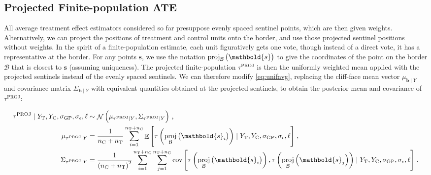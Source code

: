 \documentclass[letter]{article}
\DeclareMathOperator{\E}{\mathbb{E}}
\DeclareMathOperator{\cov}{{cov}}
\DeclareMathOperator{\normal}{\mathcal{N}}
\newcommand{\treat}{\mathrm{T}}
\newcommand{\ctrol}{\mathrm{C}}
\newcommand{\sigmaf}{\sigma_{\mathrm{GP}}}
\newcommand{\sigman}{\sigma_{\epsilon}}
\newcommand{\svec}{\mathbold{s}}
\newcommand{\boundary}{\mathcal{B}}
\newcommand{\sentinels}{\bm{b}}
\newcommand{\tauproj}{\tau^{\mathrm{PROJ}}}
\newcommand{\eqlabel}[1]{\label{#1}}
\DeclareMathOperator{\proj}{proj}
\begin{document}
    	\subsection{Projected Finite-population ATE}\label{projected-finite-population-ate}

All average treatment effect estimators considered so far presuppose evenly spaced sentinel points, which are then given weights.
Alternatively, we can project the positions of treatment and control units onto the border, and use those projected sentinel positions without weights.
In the spirit of a finite-population estimate, each unit figuratively gets one vote, though instead of a direct vote, it has a representative at the border.
For any points \(\svec\), we use the notation \(\proj_{\boundary}\del{\svec}\) to give the coordinates of the point on the border \(\boundary\) that is closest to \(\svec\) (assuming uniqueness).
The projected finite-population \(\tauproj\) is then the uniformly weighted mean applied with the projected sentinels instead of the evenly spaced sentinels.
We can therefore modify \eqref{eq:unifavg}, replacing the cliff-face mean vector \(\mu_{\sentinels \mid Y}\)
and covariance matrix \(\Sigma_{\sentinels \mid Y}\)
with equivalent quantities obtained at the projected sentinels,
to obtain the posterior mean and covariance of \(\tauproj\):

\begin{equation}\begin{split}
    \tauproj \mid Y_\treat{}, Y_\ctrol{}, \sigmaf, \sigman, \ell &\sim \normal\del{\mu_{\tauproj \mid Y}, \Sigma_{\tauproj \mid Y}}\,, \\
    \mu_{\tauproj \mid Y} &= \frac{1}{n_\ctrol{} + n_\treat{}} \sum_{i=1}^{n_\treat{}+n_\ctrol{}} 
        \E\sbr{
            \tau\del{
                \proj_{\boundary}\del{\svec_i}
            }
            \mid Y_\treat{}, Y_\ctrol{}, \sigmaf, \sigman, \ell
         } \,,\\
    \Sigma_{\tauproj \mid Y} &= \frac{1}{\del{n_\ctrol{} + n_\treat{}}^2}
        \sum_{i=1}^{n_\treat{}+n_\ctrol{}} 
        \sum_{j=1}^{n_\treat{}+n_\ctrol{}} 
        \cov\sbr{
            \tau\del{
                \proj_{\boundary}\del{\svec_i}
            },
            \tau\del{
                \proj_{\boundary}\del{\svec_j}
            }
            \mid Y_\treat{}, Y_\ctrol{}, \sigmaf, \sigman, \ell
        }\,.
\end{split}
\eqlabel{eq:tauproj}
\end{equation}
\end{document}
